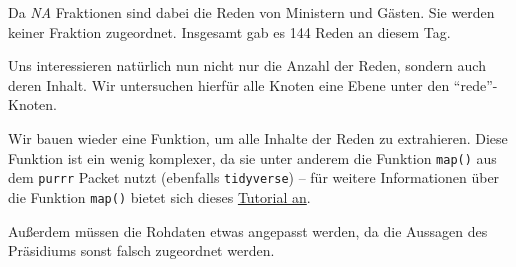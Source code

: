 \documentclass[oneside, 12pt, numbers=endperiod]{scrbook}
\newenvironment{Shaded}{\begin{snugshade}}{\end{snugshade}}
\newcommand{\KeywordTok}[1]{\textcolor[rgb]{0.13,0.29,0.53}{\textbf{#1}}}
\newcommand{\NormalTok}[1]{#1}
\newcommand{\OperatorTok}[1]{\textcolor[rgb]{0.81,0.36,0.00}{\textbf{#1}}}
\newcommand{\StringTok}[1]{\textcolor[rgb]{0.31,0.60,0.02}{#1}}
\theoremstyle{definition}
\theoremstyle{definition}
\theoremstyle{definition}
\theoremstyle{remark}
\begin{document}
Da \emph{NA} Fraktionen sind dabei die Reden von Ministern und Gästen.
Sie werden keiner Fraktion zugeordnet. Insgesamt gab es 144 Reden an
diesem Tag.

Uns interessieren natürlich nun nicht nur die Anzahl der Reden, sondern
auch deren Inhalt. Wir untersuchen hierfür alle Knoten eine Ebene unter
den ``rede''-Knoten.

\begin{Shaded}
\end{Shaded}

Wir bauen wieder eine Funktion, um alle Inhalte der Reden zu
extrahieren. Diese Funktion ist ein wenig komplexer, da sie unter
anderem die Funktion \texttt{map()} aus dem \texttt{purrr} Packet nutzt
(ebenfalls \texttt{tidyverse}) -- für weitere Informationen über die
Funktion \texttt{map()} bietet sich dieses
\href{https://jennybc.github.io/purrr-tutorial/}{Tutorial an}.

Außerdem müssen die Rohdaten etwas angepasst werden, da die Aussagen des
Präsidiums sonst falsch zugeordnet werden.
\end{document}
